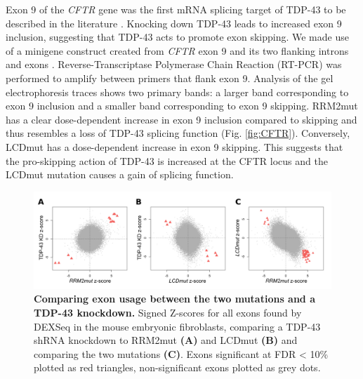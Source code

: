 Exon 9 of the \textit{CFTR} gene was the first mRNA splicing target of TDP-43 to be described in the literature \citep{Buratti2001-et}. Knocking down TDP-43 leads to increased exon 9 inclusion, suggesting that TDP-43 acts to promote exon skipping. 
We made use of a minigene construct created from \textit{CFTR} exon 9 and its two flanking introns and exons \citep{Buratti2007minigene}.
Reverse-Transcriptase Polymerase Chain Reaction (RT-PCR) was performed to amplify between primers that flank exon 9. 
Analysis of the gel electrophoresis traces shows two primary bands: a larger band corresponding to exon 9 inclusion and a smaller band corresponding to exon 9 skipping. 
RRM2mut has a clear dose-dependent increase in exon 9 inclusion compared to skipping and thus resembles a loss of TDP-43 splicing function (Fig.  \ref{fig:CFTR}). 
Conversely, LCDmut has a dose-dependent increase in exon 9 skipping.
This suggests that the pro-skipping action of TDP-43 is increased at the CFTR locus and the LCDmut mutation causes a gain of splicing function.

\begin{figure}[h]
	\centering
	\includegraphics[width=\textwidth]{Figures/05_tdp_mice/mef_scatters.png}
	\caption[Comparing exon usage between the two mutations and a TDP-43 knockdown]{
		\textbf{Comparing exon usage between the two mutations and a TDP-43 knockdown.}
	Signed Z-scores for all exons found by DEXSeq in the mouse embryonic fibroblasts, comparing a TDP-43 shRNA knockdown to RRM2mut \textbf{(A)} and LCDmut \textbf{(B)} and comparing the two mutations \textbf{(C)}. Exons significant at FDR < 10\% plotted as red triangles, non-significant exons plotted as grey dots.
}
	\label{fig:mef_scatters}
\end{figure}

